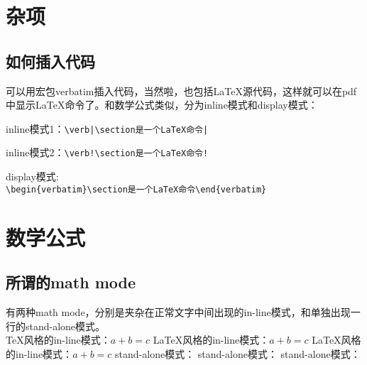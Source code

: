 \documentclass[11pt,a4paper]{article}
\begin{document}
\section{杂项}

\subsection{如何插入代码}

可以用宏包verbatim插入代码，当然啦，也包括LaTeX源代码，这样就可以在pdf中显示LaTeX命令了。和数学公式类似，分为inline模式和display模式：

inline模式1：\verb!\verb|\section是一个LaTeX命令|!

inline模式2：\verb|\verb!\section是一个LaTeX命令!|

display模式:\\
\verb|\begin{verbatim}\section是一个LaTeX命令\end{verbatim}|

\section{数学公式}

\subsection{所谓的math mode}

有两种math mode，分别是夹杂在正常文字中间出现的in-line模式，和单独出现一行的stand-alone模式。\\
\TeX 风格的in-line模式：$ a + b = c $
\LaTeX 风格的in-line模式：\( a + b = c \)
\LaTeX 风格的in-line模式：\begin{math} a + b = c \end{math}
stand-alone模式：
stand-alone模式：
stand-alone模式：
\end{document}
